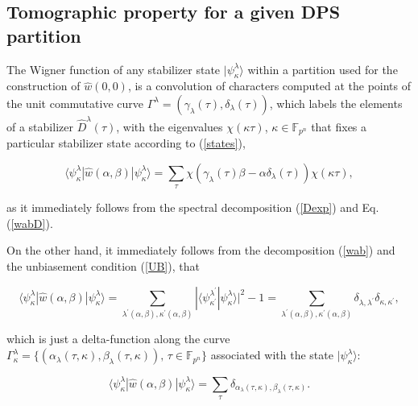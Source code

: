 \documentclass[quantumrep,article,submit,pdftex,moreauthors]{Definitions/mdpi}
\begin{document}
\subsection{Tomographic property for a given DPS partition}

The Wigner function of any stabilizer state $|\psi_{\kappa}^{\lambda}\rangle$
within a partition used for the construction of $\hat{w}\left(0,0\right)$, is a
convolution of characters computed at the points of the unit commutative curve
$\Gamma^{\lambda}=\left(\gamma_{\lambda}\left(\tau\right),\delta_{\lambda}(\tau)\right)
$, which labels the elements of a stabilizer $\hat{D}^{\lambda}(\tau)$, with the
eigenvalues $\chi(\kappa\tau)$, $\kappa \in \mathbb F_{p^{n}}$ that fixes a
particular stabilizer state according to (\ref{states}),

\begin{equation}
  \langle \psi_{\kappa}^{\lambda}|\hat{w}\left( \alpha,\beta \right)
  |\psi_{\kappa}^{\lambda}\rangle
  = \sum_{\tau }\chi \left(
    \gamma_{\lambda}(\tau)\beta-\alpha \delta_{\lambda}(\tau)
  \right) \chi(\kappa\tau),
  \label{T1}
\end{equation}

as it immediately follows from the spectral decomposition (\ref{Dexp}) and Eq.
(\ref{wabD}).

On the other hand, it immediately follows from the decomposition (\ref{wab}) and
the unbiasement condition (\ref{UB}), that

\begin{equation}
  \langle \psi_{\kappa }^{\lambda}|\hat{w}\left( \alpha,\beta \right)
  |\psi_{\kappa}^{\lambda}\rangle
  = \sum_{\lambda^{\prime}(\alpha,\beta),\kappa^{\prime }(\alpha,\beta)}
  |\langle
    \psi_{\kappa^{\prime}}^{\lambda^{\prime }}|\psi_{\kappa}^{\lambda}
  \rangle|^{2}-1
  = \sum_{\lambda^{\prime}(\alpha,\beta),\kappa^{\prime}(\alpha,\beta)}
  \delta_{\lambda,\lambda^{\prime}}\delta_{\kappa,\kappa^{\prime}},
\end{equation}

which is just a delta-function along the curve $\Gamma_{\kappa}^{\lambda} =
\{(\alpha_{\lambda}(\tau,\kappa),\beta_{\lambda}(\tau,\kappa)),\,\tau \in
\mathbb F_{p^{n}}\}$ associated with the state $|\psi_{\kappa
}^{\lambda}\rangle$:

\begin{equation}
  \langle \psi_{\kappa}^{\lambda}
  |\hat{w}\left( \alpha,\beta \right)
  |\psi_{\kappa }^{\lambda}
  \rangle = \sum_{\tau} \delta_{\alpha_{\lambda}(\tau,\kappa),
  \beta_{\lambda}(\tau ,\kappa )}.
  \label{T2}
\end{equation}
\end{document}
